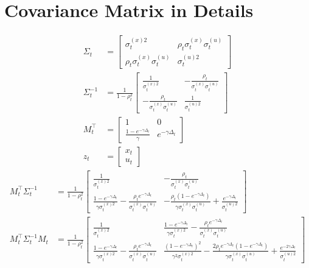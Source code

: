 \section{Covariance Matrix in Details}\label{covMatrixdetails}

\begin{align*}
\Sigma_t &= \begin{bmatrix}
\sigma_t^{(x)2} & \rho_{t} \sigma_t^{(x)} \sigma_t^{(u)}\\
 \rho_{t} \sigma_t^{(x)} \sigma_t^{(u)} & \sigma_t^{(u)2} 
\end{bmatrix}\\
\Sigma_t^{-1} &= \frac{1}{1-\rho_{t}^2} \begin{bmatrix} \frac{1}{\sigma_t^{(x)2}} & -\frac{\rho_{t}}{\sigma_t^{(x)} \sigma_t^{(u)} }\\
-\frac{\rho_{t}}{\sigma_t^{(x)} \sigma_t^{(u)} } & \frac{1}{\sigma_t^{(u)2}} \end{bmatrix}\\
M_t^\top &= \begin{bmatrix}
1 & 0 \\
\frac{1-e^{-\gamma \Delta_t}}{\gamma} & e^{-\gamma \Delta_t}
\end{bmatrix} \\
z_t &= \begin{bmatrix} x_t \\ u_t \end{bmatrix}
\end{align*}
\begin{align*}
M_t^\top \Sigma_t^{-1} &= \frac{1}{1-\rho_{t}^2} 
\begin{bmatrix}
\frac{1}{\sigma_t^{(x)2}}  & -\frac{\rho_{t}}{\sigma_t^{(x)} \sigma_t^{(u)} }\\
\frac{1-e^{-\gamma \Delta_t}}{\gamma\sigma_t^{(x)2}} -\frac{\rho_{t} e^{-\gamma \Delta_t}}{\sigma_t^{(x)} \sigma_t^{(u)} }  & 
 -\frac{\rho_{t} (1-e^{-\gamma \Delta_t}) }{ \gamma \sigma_t^{(x)} \sigma_t^{(u)} } + \frac{  e^{-\gamma\Delta_t} }{   \sigma_t^{(u)2} }
\end{bmatrix} \\
M_t^\top \Sigma_t^{-1} M_t&= \frac{1}{1-\rho_{t}^2} 
\begin{bmatrix}
\frac{1}{\sigma_t^{(x)2}}  &  \frac{1-e^{-\gamma\Delta_t}}{\gamma\sigma_t^{(x)2}} -\frac{\rho_{t} e^{-\gamma\Delta_t}}{\sigma_t^{(x)}\sigma_t^{(u)}} \\
\frac{1-e^{-\gamma \Delta_t}}{\gamma\sigma_t^{(x)2}} -\frac{\rho_{t} e^{-\gamma \Delta_t}}{\sigma_t^{(x)} \sigma_t^{(u)} }  & 
\frac{ (1-e^{-\gamma \Delta_t})^2}{\gamma^2\sigma_t^{(x)2}} - \frac{2 \rho_{t} e^{-\gamma \Delta_t} (1-e^{-\gamma\Delta_t}) }{\gamma\sigma_t^{(x)} \sigma_t^{(u)} } +\frac{e^{-2\gamma\Delta_t}}{\sigma_t^{(u)2}}
\end{bmatrix} 
\end{align*}

